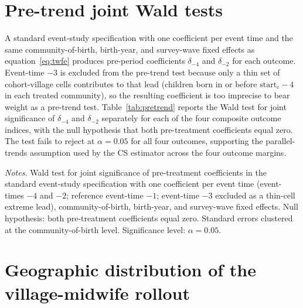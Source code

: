 {\footnotesize
\setlength{\tabcolsep}{4pt}
\renewcommand{\arraystretch}{0.92}

}


\section{Pre-trend joint Wald tests}
\label{app:pretrend}

A standard event-study specification with one coefficient per event time and the same community-of-birth, birth-year, and survey-wave fixed effects as equation~\eqref{eq:twfe} produces pre-period coefficients $\delta_{-4}$ and $\delta_{-2}$ for each outcome. Event-time $-3$ is excluded from the pre-trend test because only a thin set of cohort-village cells contributes to that lead (children born in or before $\text{start}_c - 4$ in each treated community), so the resulting coefficient is too imprecise to bear weight as a pre-trend test.
Table~\ref{tab:pretrend} reports the Wald test for joint significance of $\delta_{-4}$ and $\delta_{-2}$ separately for each of the four composite outcome indices, with the null hypothesis that both pre-treatment coefficients equal zero.
The test fails to reject at $\alpha = 0.05$ for all four outcomes, supporting the parallel-trends assumption used by the CS estimator across the four outcome margins.

\begin{table}[!htbp]
\centering
\caption{Event-study pre-trend test (joint Wald, event-times $-4$ and $-2$).}
\label{tab:pretrend}

\begin{minipage}{0.85\textwidth}
\footnotesize
\emph{Notes.} Wald test for joint significance of pre-treatment coefficients in the standard event-study specification with one coefficient per event time (event-times $-4$ and $-2$; reference event-time $-1$; event-time $-3$ excluded as a thin-cell extreme lead), community-of-birth, birth-year, and survey-wave fixed effects. Null hypothesis: both pre-treatment coefficients equal zero. Standard errors clustered at the community-of-birth level. Significance level: $\alpha = 0.05$.
\end{minipage}
\end{table}


\section{Geographic distribution of the village-midwife rollout}
\label{app:indonesia_map}

